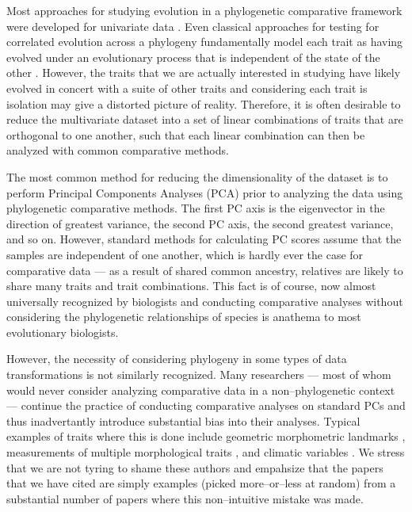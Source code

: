 \documentclass[a4paper,12pt]{article}
\begin{document}
Most approaches for studying evolution in a phylogenetic comparative framework were developed for univariate data \citep[reviewed in][]{PennellHarmon}. Even classical approaches for testing for correlated evolution across a phylogeny \citep[e.g.,][]{Felsenstein1985, Grafen1989, HarveyPagel1991} fundamentally model each trait as having evolved under an evolutionary process that is independent of the state of the other \citep{HansenOrzack2005}. However, the traits that we are actually interested in studying have likely evolved in concert with a suite of other traits and considering each trait is isolation may give a distorted picture of reality. Therefore, it is often desirable to reduce the multivariate dataset into a set of linear combinations of traits that are orthogonal to one another, such that each linear combination can then be analyzed with common comparative methods.

The most common method for reducing the dimensionality of the dataset is to perform Principal Components Analyses (PCA) prior to analyzing the data using phylogenetic comparative methods. The first PC axis is the eigenvector in the direction of greatest variance, the second PC axis, the second greatest variance, and so on. However, standard methods for calculating PC scores assume that the samples are independent of one another, which is hardly ever the case for comparative data --- as a result of shared common ancestry, relatives are likely to share many traits and trait combinations. This fact is of course, now almost universally recognized by biologists and conducting comparative analyses without considering the phylogenetic relationships of species is anathema to most evolutionary biologists. 

However, the necessity of considering phylogeny in some types of data transformations \citep{Revell2008} is not similarly recognized. Many researchers --- most of whom would never consider analyzing comparative data in a non--phylogenetic context --- continue the practice of conducting comparative analyses on standard PCs and thus inadvertantly introduce substantial bias into their analyses. Typical examples of traits where this is done include geometric morphometric landmarks \citep[e.g.,][]{Dornburg2011, Hunt2013}, measurements of multiple morphological traits \citep[e.g.,][]{Harmon2010, BergmannIrshick2012, Weir2012, Pienaar2013, Price2014}, and climatic variables \citep[e.g.,][]{KozakWiens2010, Schnitzler2012}. We stress that we are not tyring to shame these authors and empahsize that the papers that we have cited are simply examples (picked more--or--less at random) from a substantial number of papers where this non--intuitive mistake was made.
\end{document}
